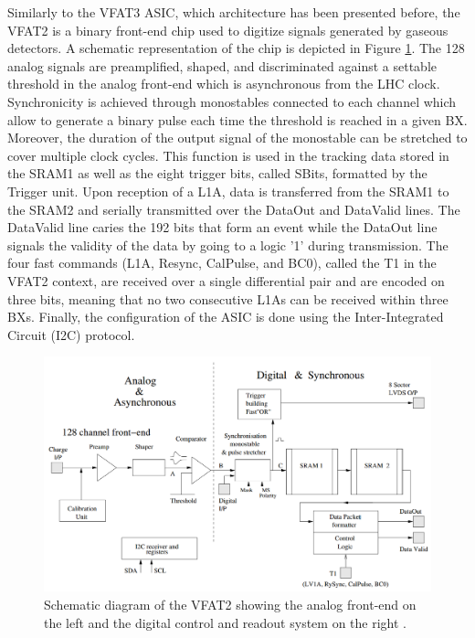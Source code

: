       Similarly to the VFAT3 ASIC, which architecture has been presented before, the VFAT2 is a binary front-end chip used to digitize signals generated by gaseous detectors. A schematic representation of the chip is depicted in Figure \ref{fig:II-2-vfat2}. The 128 analog signals are preamplified, shaped, and discriminated against a settable threshold in the analog front-end which is asynchronous from the LHC clock. Synchronicity is achieved through monostables connected to each channel which allow to generate a binary pulse each time the threshold is reached in a given BX. Moreover, the duration of the output signal of the monostable can be stretched to cover multiple clock cycles. This function is used in the tracking data stored in the SRAM1 as well as the eight trigger bits, called SBits, formatted by the Trigger unit. Upon reception of a L1A, data is transferred from the SRAM1 to the SRAM2 and serially transmitted over the DataOut and DataValid lines. The DataValid line caries the 192 bits that form an event while the DataOut line signals the validity of the data by going to a logic '1' during transmission. The four fast commands (L1A, Resync, CalPulse, and BC0), called the T1 in the VFAT2 context, are received over a single differential pair and are encoded on three bits, meaning that no two consecutive L1As can be received within three BXs. Finally, the configuration of the ASIC is done using the Inter-Integrated Circuit (I2C) protocol. \\

      \begin{figure}[h!]
        \centering
        \includegraphics[width=\textwidth]{img/II-2-daq/vfat2.png}
        \caption{Schematic diagram of the VFAT2 showing the analog front-end on the left and the digital control and readout system on the right \cite{Aspell:1069906}.}
        \label{fig:II-2-vfat2}
      \end{figure}

